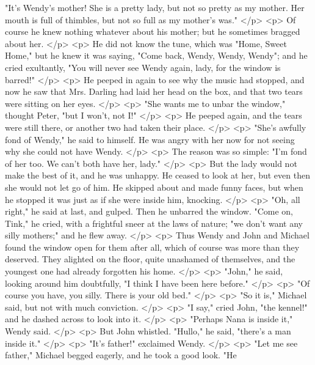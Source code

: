       "It's Wendy's mother! She is a pretty lady, but not so pretty as my
      mother. Her mouth is full of thimbles, but not so full as my mother's
      was."
    </p>
    <p>
      Of course he knew nothing whatever about his mother; but he sometimes
      bragged about her.
    </p>
    <p>
      He did not know the tune, which was "Home, Sweet Home," but he knew it was
      saying, "Come back, Wendy, Wendy, Wendy"; and he cried exultantly, "You
      will never see Wendy again, lady, for the window is barred!"
    </p>
    <p>
      He peeped in again to see why the music had stopped, and now he saw that
      Mrs. Darling had laid her head on the box, and that two tears were sitting
      on her eyes.
    </p>
    <p>
      "She wants me to unbar the window," thought Peter, "but I won't, not I!"
    </p>
    <p>
      He peeped again, and the tears were still there, or another two had taken
      their place.
    </p>
    <p>
      "She's awfully fond of Wendy," he said to himself. He was angry with her
      now for not seeing why she could not have Wendy.
    </p>
    <p>
      The reason was so simple: "I'm fond of her too. We can't both have her,
      lady."
    </p>
    <p>
      But the lady would not make the best of it, and he was unhappy. He ceased
      to look at her, but even then she would not let go of him. He skipped
      about and made funny faces, but when he stopped it was just as if she were
      inside him, knocking.
    </p>
    <p>
      "Oh, all right," he said at last, and gulped. Then he unbarred the window.
      "Come on, Tink," he cried, with a frightful sneer at the laws of nature;
      "we don't want any silly mothers;" and he flew away.
    </p>
    <p>
      Thus Wendy and John and Michael found the window open for them after all,
      which of course was more than they deserved. They alighted on the floor,
      quite unashamed of themselves, and the youngest one had already forgotten
      his home.
    </p>
    <p>
      "John," he said, looking around him doubtfully, "I think I have been here
      before."
    </p>
    <p>
      "Of course you have, you silly. There is your old bed."
    </p>
    <p>
      "So it is," Michael said, but not with much conviction.
    </p>
    <p>
      "I say," cried John, "the kennel!" and he dashed across to look into it.
    </p>
    <p>
      "Perhaps Nana is inside it," Wendy said.
    </p>
    <p>
      But John whistled. "Hullo," he said, "there's a man inside it."
    </p>
    <p>
      "It's father!" exclaimed Wendy.
    </p>
    <p>
      "Let me see father," Michael begged eagerly, and he took a good look. "He
